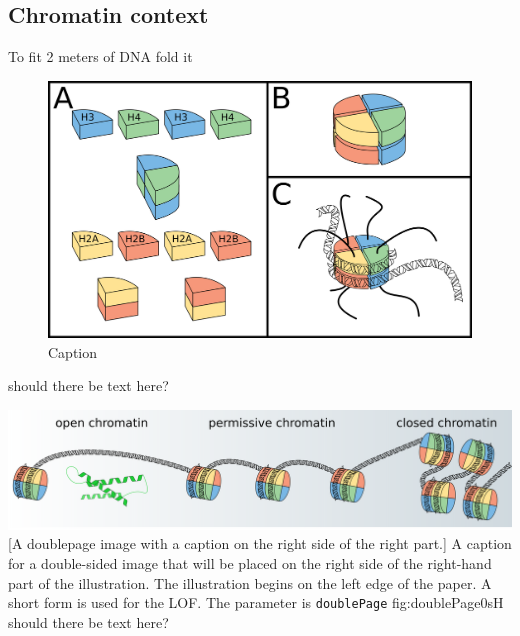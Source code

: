 \subsection{Chromatin context}

To fit 2 meters of DNA fold it

\begin{figure}[H]
    \includegraphics[width=\linewidth]{ch1.Introduction/imgs/histones.png}
    \caption{Caption}
    \label{fig:histones}
\end{figure}

should there be text here?

%
    {\includegraphics[doublefullPage]{ch1.Introduction/imgs/accessibility_horizontal.png}}%
    [A doublepage image with a caption on the right side of the right part.]%
    {A caption for a double-sided image that will be placed on the right side of the
    right-hand part of the illustration. The illustration begins on the left edge of
    the paper. A short form is used for the LOF.
    The parameter is \texttt{doublePage}}%
    {fig:doublePage0sH}
should there be text here?

